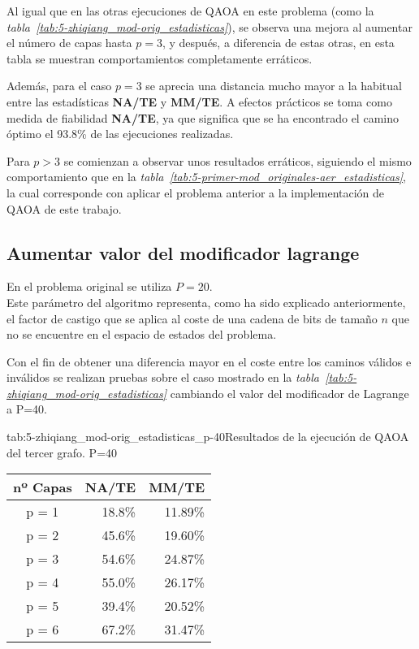 Al igual que en las otras ejecuciones de QAOA en este problema (como la \textit{tabla~\ref{tab:5-zhiqiang_mod-orig_estadisticas}}), se observa una mejora al aumentar el número de capas hasta $p = 3$, y después, a diferencia de estas otras, en esta tabla se muestran comportamientos completamente erráticos.

Además, para el caso $p = 3$ se aprecia una distancia mucho mayor a la habitual entre las estadísticas \textbf{NA/TE} y \textbf{MM/TE}.
A efectos prácticos se toma como medida de fiabilidad \textbf{NA/TE}, ya que significa que se ha encontrado el camino óptimo el 93.8\% de las ejecuciones realizadas.

Para $p > 3$ se comienzan a observar unos resultados erráticos, siguiendo el mismo comportamiento que en la \textit{tabla~\ref{tab:5-primer-mod_originales-aer_estadisticas}}, la cual corresponde con aplicar el problema anterior a la implementación de QAOA de este trabajo.

\subsection{Aumentar valor del modificador lagrange}

En el problema original se utiliza $P=20$.
\\
Este parámetro del algoritmo representa, como ha sido explicado anteriormente, el factor de castigo que se aplica al coste de una cadena de bits de tamaño $n$ que no se encuentre en el espacio de estados del problema.

Con el fin de obtener una diferencia mayor en el coste entre los caminos válidos e inválidos se realizan pruebas sobre el caso mostrado en la \textit{tabla~\ref{tab:5-zhiqiang_mod-orig_estadisticas}} cambiando el valor del modificador de Lagrange a P=40.

\begin{table}[Resultados QAOA {--} artículo de Fan \textit{et al.} (2023) {--} $P = 40$]{tab:5-zhiqiang_mod-orig_estadisticas_p-40}{Resultados de la ejecución de QAOA del tercer grafo. P=40}
  \centering
  \begin{tabular}{|c|r|r|}
    \hline
    \textbf{nº Capas} & \textbf{NA/TE} & \textbf{MM/TE} \\ \hline
    p = 1 & 18.8\% & 11.89\% \\ \hline
    p = 2 & 45.6\% & 19.60\% \\ \hline
    p = 3 & 54.6\% & 24.87\% \\ \hline
    p = 4 & 55.0\% & 26.17\% \\ \hline
    p = 5 & 39.4\% & 20.52\% \\ \hline
    p = 6 & 67.2\% & 31.47\% \\ \hline
  \end{tabular}
\end{table}

